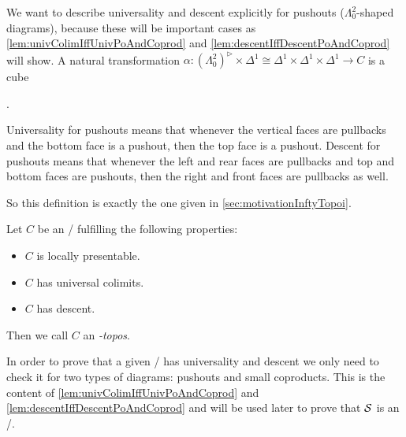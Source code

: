 \begin{remark}
    We want to describe universality and descent explicitly for pushouts ($\Lambda^2_0$-shaped diagrams), because these will be important cases as \cref{lem:univColimIffUnivPoAndCoprod} and \cref{lem:descentIffDescentPoAndCoprod} will show.
    A natural transformation $\alpha\colon\left(\Lambda_0^2\right)^{\rhd}\times\Delta^1\cong\Delta^1\times\Delta^1\times\Delta^1\to C$ is a cube
    \begin{center} %
        \;.
    \end{center}
    Universality for pushouts means that whenever the vertical faces are pullbacks and the bottom face is a pushout, then the top face is a pushout.
    Descent for pushouts means that whenever the left and rear faces are pullbacks and top and bottom faces are pushouts, then the right and front faces are pullbacks as well.
    
    So this definition is exactly the one given in \cref{sec:motivationInftyTopoi}.
\end{remark}
\begin{definition}
    Let $C$ be an \inftycat/ fulfilling the following properties:
    \begin{itemize}
        \item $C$ is locally presentable.
        \item $C$ has universal colimits.
        \item $C$ has descent.
    \end{itemize}
    Then we call $C$ an \emph{\infty-topos}.
\end{definition}
In order to prove that a given \inftycat/ has universality and descent we only need to check it for two types of diagrams: pushouts and small coproducts.
This is the content of \cref{lem:univColimIffUnivPoAndCoprod} and \cref{lem:descentIffDescentPoAndCoprod} and will be used later to prove that $\mathcal{S}$ is an \inftytop/.

